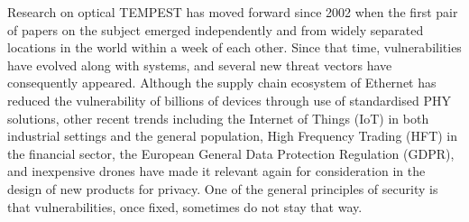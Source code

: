Research on optical TEMPEST has moved forward since 2002 when the first pair
of papers on the subject emerged independently and from widely separated
locations in the world within a week of each other. Since that time,
vulnerabilities have evolved along with systems, and several new threat
vectors have consequently appeared. Although the supply chain ecosystem of
Ethernet has reduced the vulnerability of billions of devices through use of
standardised PHY solutions, other recent trends including the Internet of
Things (IoT) in both industrial settings and the general population, High
Frequency Trading (HFT) in the financial sector, the European General Data
Protection Regulation (GDPR), and inexpensive drones have made it relevant
again for consideration in the design of new products for privacy. One of the
general principles of security is that vulnerabilities, once fixed, sometimes
do not stay that way.
